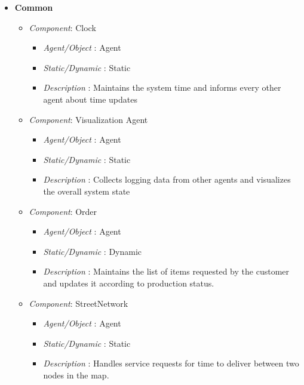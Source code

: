 \documentclass[11pt, a4paper]{article}
\begin{document}
\begin{itemize}
	\item \textbf{Common}
	\begin{itemize}
	\item \textit{Component}: Clock
	\begin{itemize}
		\item \textit{Agent/Object} : Agent
		\item \textit{Static/Dynamic} : Static
		\item \textit{Description} : Maintains the system time and informs every other agent about time updates
	\end{itemize}
	\item \textit{Component}: Visualization Agent
	\begin{itemize}
		\item \textit{Agent/Object} : Agent
		\item \textit{Static/Dynamic} : Static
		\item \textit{Description} : Collects logging data from other agents and visualizes the overall system state
	\end{itemize}
	\item \textit{Component}: Order
	\begin{itemize}
		\item \textit{Agent/Object} : Agent
		\item \textit{Static/Dynamic} : Dynamic
		\item \textit{Description} : Maintains the list of items requested by the customer and updates it according to production status.
	\end{itemize}
	\item \textit{Component}: StreetNetwork
	\begin{itemize}
		\item \textit{Agent/Object} : Agent
		\item \textit{Static/Dynamic} : Static
		\item \textit{Description} : Handles service requests for time to deliver between two nodes in the map.
	\end{itemize}
	\end{itemize}


\end{itemize}
\end{document}
